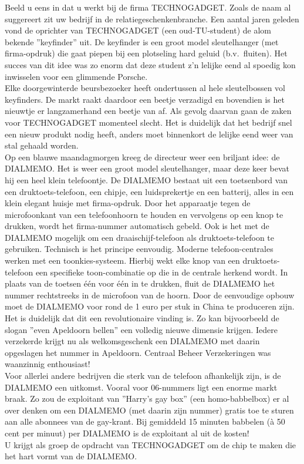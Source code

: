 Beeld u eens in dat u werkt bij de firma TECHNOGADGET.
Zoals de naam al suggereert zit uw bedrijf in de
relatiegeschenkenbranche. 
Een aantal jaren geleden vond de oprichter van TECHNOGADGET
(een oud-TU-student) de alom bekende ''keyfinder'' uit. De keyfinder
is een groot model sleutelhanger (met firma-opdruk) die gaat piepen
bij een plotseling hard geluid (b.v.\ fluiten). Het succes van dit idee
was zo enorm dat deze student z'n lelijke eend al spoedig kon
inwisselen voor een glimmende Porsche.\\
Elke doorgewinterde beursbezoeker heeft ondertussen al hele
sleutelbossen vol keyfinders. De markt raakt daardoor een beetje
verzadigd en bovendien is het nieuwtje er langzamerhand een beetje van
af. Als gevolg daarvan gaan de zaken voor TECHNOGADGET momenteel
slecht. Het is duidelijk dat het bedrijf snel een nieuw produkt nodig
heeft, anders moet binnenkort de lelijke eend weer van stal gehaald
worden.\\
Op een blauwe maandagmorgen kreeg de directeur weer een briljant idee:
de DIALMEMO. Het is weer een groot model sleutelhanger, maar deze keer
bevat hij een heel klein telefoontje.
De DIALMEMO bestaat uit een toetsenbord van een druktoets-telefoon,
een chipje, een luidsprekertje en een batterij, alles in een klein
elegant huisje met firma-opdruk. Door het apparaatje tegen de
microfoonkant van een telefoonhoorn te houden en vervolgens op een
knop te drukken, wordt het firma-nummer automatisch gebeld. Ook is het
met de DIALMEMO mogelijk om een draaischijf-telefoon als
druktoets-telefoon te gebruiken.
Technisch is het principe eenvoudig. Moderne telefoon-centrales werken
met een toonkies-systeem. Hierbij wekt elke knop van een
druktoets-telefoon een specifieke toon-combinatie op die in de centrale
herkend wordt. In plaats van de toetsen \'e\'en voor \'e\'en in te
drukken, fluit de DIALMEMO het nummer rechtstreeks in de microfoon van
de hoorn. Door de eenvoudige opbouw moet de DIALMEMO voor rond de
1 euro per stuk in China te produceren zijn. \\
Het is duidelijk dat dit een revolutionaire vinding is. Zo kan
bijvoorbeeld de slogan ''even Apeldoorn bellen'' een volledig nieuwe
dimensie krijgen. Iedere verzekerde krijgt nu als welkomsgeschenk een
DIALMEMO met daarin opgeslagen het nummer in Apeldoorn. Centraal
Beheer Verzekeringen was waanzinnig enthousiast!\\
Voor allerlei andere
bedrijven die sterk van de telefoon afhankelijk zijn, is de DIALMEMO
een uitkomst. Vooral voor 06-nummers ligt een enorme markt braak. Zo
zou de exploitant van ''Harry's gay box'' (een homo-babbelbox) er al
over denken om een DIALMEMO (met daarin zijn nummer) gratis toe te
sturen aan alle abonnees van de gay-krant. Bij gemiddeld 15 minuten
babbelen (\`a 50 cent per minuut) per DIALMEMO is de exploitant al uit
de kosten!\\
U krijgt als groep de opdracht van TECHNOGADGET om de chip te maken
die het hart vormt van de DIALMEMO.


